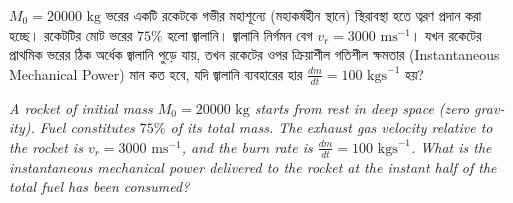 \documentclass[12pt, a4paper]{article}
\begin{document}
\begin{tcolorbox}[questionbox={প্রশ্ন (Question) 6}]
    \noindent
    $M_0 = 20000\text{ kg}$ ভরের একটি রকেটকে গভীর মহাশূন্যে (মহাকর্ষহীন স্থানে) স্থিরাবস্থা হতে ত্বরণ প্রদান করা হচ্ছে। রকেটটির মোট ভরের $75\%$ হলো জ্বালানি। জ্বালানি নির্গমন বেগ $v_r = 3000\text{ ms}^{-1}$। যখন রকেটের প্রাথমিক ভরের ঠিক অর্ধেক জ্বালানি পুড়ে যায়, তখন রকেটের ওপর ক্রিয়াশীল গতিশীল ক্ষমতার (Instantaneous Mechanical Power) মান কত হবে, যদি জ্বালানি ব্যবহারের হার $\frac{dm}{dt} = 100\text{ kgs}^{-1}$ হয়?
    
    \vspace{0.8em}
    \begin{english}
    \noindent\textit{\color{darkgray}
    A rocket of initial mass $M_0 = 20000\text{ kg}$ starts from rest in deep space (zero gravity). Fuel constitutes $75\%$ of its total mass. The exhaust gas velocity relative to the rocket is $v_r = 3000\text{ ms}^{-1}$, and the burn rate is $\frac{dm}{dt} = 100\text{ kgs}^{-1}$. What is the instantaneous mechanical power delivered to the rocket at the instant half of the total fuel has been consumed?
    }
    \end{english}
\end{tcolorbox}
\end{document}

